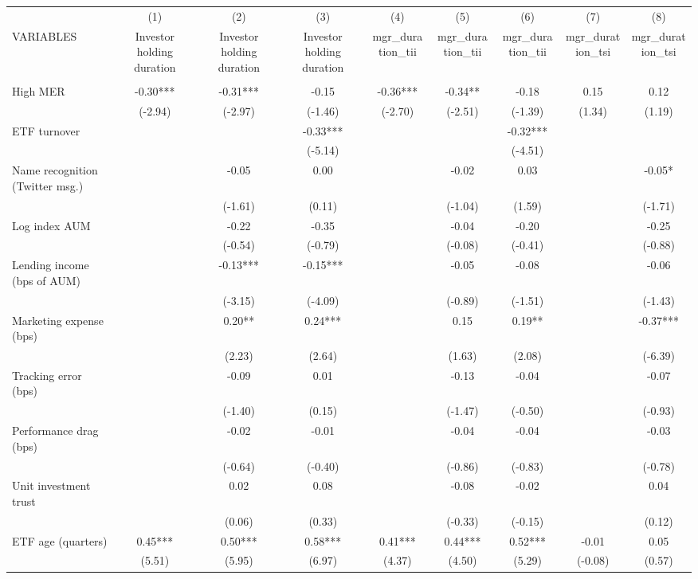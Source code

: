 \documentclass[]{article}
\begin{document}
\begin{tabular}{lcccccccc} \hline
 & (1) & (2) & (3) & (4) & (5) & (6) & (7) & (8) \\
VARIABLES & Investor holding duration & Investor holding duration & Investor holding duration & mgr\_duration\_tii & mgr\_duration\_tii & mgr\_duration\_tii & mgr\_duration\_tsi & mgr\_duration\_tsi \\ \hline
 &  &  &  &  &  &  &  &  \\
High MER & -0.30*** & -0.31*** & -0.15 & -0.36*** & -0.34** & -0.18 & 0.15 & 0.12 \\
 & (-2.94) & (-2.97) & (-1.46) & (-2.70) & (-2.51) & (-1.39) & (1.34) & (1.19) \\
ETF turnover &  &  & -0.33*** &  &  & -0.32*** &  &  \\
 &  &  & (-5.14) &  &  & (-4.51) &  &  \\
Name recognition (Twitter msg.) &  & -0.05 & 0.00 &  & -0.02 & 0.03 &  & -0.05* \\
 &  & (-1.61) & (0.11) &  & (-1.04) & (1.59) &  & (-1.71) \\
Log index AUM &  & -0.22 & -0.35 &  & -0.04 & -0.20 &  & -0.25 \\
 &  & (-0.54) & (-0.79) &  & (-0.08) & (-0.41) &  & (-0.88) \\
Lending income (bps of AUM) &  & -0.13*** & -0.15*** &  & -0.05 & -0.08 &  & -0.06 \\
 &  & (-3.15) & (-4.09) &  & (-0.89) & (-1.51) &  & (-1.43) \\
Marketing expense (bps) &  & 0.20** & 0.24*** &  & 0.15 & 0.19** &  & -0.37*** \\
 &  & (2.23) & (2.64) &  & (1.63) & (2.08) &  & (-6.39) \\
Tracking error (bps) &  & -0.09 & 0.01 &  & -0.13 & -0.04 &  & -0.07 \\
 &  & (-1.40) & (0.15) &  & (-1.47) & (-0.50) &  & (-0.93) \\
Performance drag (bps) &  & -0.02 & -0.01 &  & -0.04 & -0.04 &  & -0.03 \\
 &  & (-0.64) & (-0.40) &  & (-0.86) & (-0.83) &  & (-0.78) \\
Unit investment trust &  & 0.02 & 0.08 &  & -0.08 & -0.02 &  & 0.04 \\
 &  & (0.06) & (0.33) &  & (-0.33) & (-0.15) &  & (0.12) \\
ETF age (quarters) & 0.45*** & 0.50*** & 0.58*** & 0.41*** & 0.44*** & 0.52*** & -0.01 & 0.05 \\
 & (5.51) & (5.95) & (6.97) & (4.37) & (4.50) & (5.29) & (-0.08) & (0.57) \\

\end{tabular}
\end{document}
